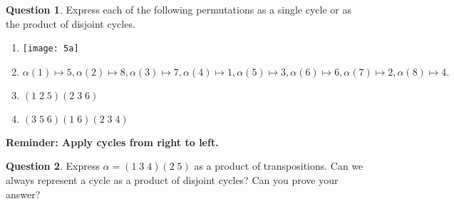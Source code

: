 \documentclass[a4paper,12pt]{article}
\theoremstyle{definition}
\newtheorem{question}{Question}%
\theoremstyle{remark}
\begin{document}
\begin{question}
  Express each of the following permutations as a single cycle or as the product of disjoint cycles.
  \begin{enumerate}
 \item \texttt{[image: 5a]}
   \item $\alpha(1) \mapsto 5, \alpha(2) \mapsto 8, \alpha(3) \mapsto 7, \alpha(4) \mapsto 1, \alpha(5) \mapsto 3, \alpha(6) \mapsto 6, \alpha(7) \mapsto 2, \alpha(8) \mapsto 4. $
      \item $(1\;2\;5)(2\;3\;6)$
        \item $(3\;5\;6)(1\;6)(2\;3\;4)$
  \end{enumerate}

\textbf{Reminder: Apply cycles from right to left.}

\end{question}



\begin{question}
Express $\alpha = (1\;3\;4)(2\;5)$ as a product of transpositions. Can we always represent a cycle as a product of disjoint cycles? Can you prove your answer?
\end{question}



 


\pagebreak
\end{document}
